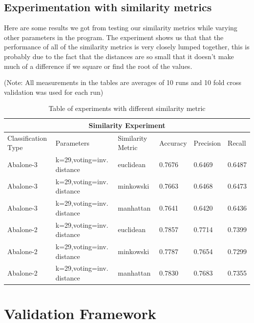 \subsection{Experimentation with similarity metrics}

Here are some results we got from testing our similarity metrics while varying other parameters in the program. 
The experiment shows us that that the performance of all of the similarity metrics is very closely lumped together, this is probably due to the fact that the distances are so small that it doesn't make much of a difference if we square or find the root of the values. 

(Note: All measurements in the tables are averages of 10 runs and 10 fold cross validation was used for each run)
\begin{table}
\centering
\begin{tabular}{|p{2cm}|p{3cm}||p{2cm}|p{1.5cm}|p{1.5cm}|p{1.5cm}|}
 \hline
 \multicolumn{6}{|c|}{Similarity Experiment} \\
 \hline
 Classification Type & Parameters & Similarity Metric & Accuracy & Precision & Recall\\
 \hline
 Abalone-3 & k=29,voting=inv. distance &   euclidean & 0.7676  & 0.6469 & 0.6487\\
 \hline
 Abalone-3 & k=29,voting=inv. distance &   minkowski & 0.7663 & 0.6468 & 0.6473\\
 \hline
 Abalone-3 & k=29,voting=inv. distance &   manhattan & 0.7641 & 0.6420 & 0.6436\\ 
 \hline
 \hline
 Abalone-2 & k=29,voting=inv. distance &   euclidean & 0.7857  & 0.7714 & 0.7399\\
 \hline
 Abalone-2 & k=29,voting=inv. distance &   minkowski & 0.7787 & 0.7654 & 0.7299\\
 \hline
 Abalone-2 & k=29,voting=inv. distance &   manhattan & 0.7830  & 0.7683 & 0.7355\\ 
 \hline

\end{tabular}
\caption{Table of experiments with different similarity metric}
\end{table}
\label{Figure 1}




\section{Validation Framework}

